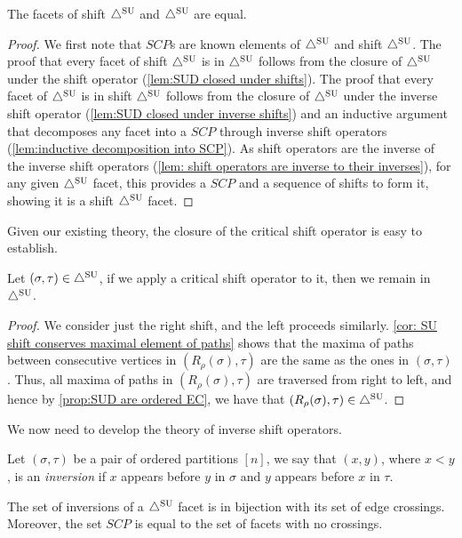\begin{proposition} 
    \label{prop: shift SUD and SUD are equal}
The facets of shift $\triangle^{\mathrm{SU}}$ and $\triangle^{\mathrm{SU}}$ are equal.
\end{proposition}
\begin{proof}
We first note that $SCP$s are known elements of $\triangle^{\mathrm{SU}}$ and shift $\triangle^{\mathrm{SU}}$.
The proof that every facet of shift $\triangle^{\mathrm{SU}}$ is in $\triangle^{\mathrm{SU}}$ follows from the closure of $\triangle^{\mathrm{SU}}$ under the shift operator (\cref{lem:SUD closed under shifts}).
The proof that every facet of $\triangle^{\mathrm{SU}}$ is in shift $\triangle^{\mathrm{SU}}$ follows from the closure of $\triangle^{\mathrm{SU}}$ under the inverse shift operator (\cref{lem:SUD closed under inverse shifts}) and an inductive argument that decomposes any facet into a $SCP$ through inverse shift operators (\cref{lem:inductive decomposition into SCP}).
As shift operators are the inverse of the inverse shift operators (\cref{lem: shift operators are inverse to their inverses}), for any given $\triangle^{\mathrm{SU}}$ facet, this provides a $SCP$ and a sequence of shifts to form it, showing it is a shift $\triangle^{\mathrm{SU}}$ facet.
\end{proof}
Given our existing theory, the closure of the critical shift operator is easy to establish.
\begin{lemma} \label{lem:SUD closed under shifts}
Let $(\sigma,\tau)\in \triangle^{\mathrm{SU}}$, if we apply a critical shift operator to it, then we remain in $\triangle^{\mathrm{SU}}$.
\end{lemma}
\begin{proof}
We consider just the right shift, and the left proceeds similarly. 
\cref{cor: SU shift conserves maximal element of paths} shows that the maxima of paths between consecutive vertices in $(R_{\rho}(\sigma),\tau)$ are the same as the ones in $(\sigma,\tau)$. 
Thus, all maxima of paths in $(R_{\rho}(\sigma),\tau)$ are traversed from right to left, and hence by \cref{prop:SUD are ordered EC}, we have that $(R_{\rho}(\sigma),\tau) \in \triangle^{\mathrm{SU}}$.   
\end{proof}

We now need to develop the theory of inverse shift operators.

\begin{definition}
Let $(\sigma,\tau)$ be a pair of ordered partitions $[n]$, we say that $(x,y)$, where $x<y$, is an \emph{inversion} if $x$ appears before $y$ in $\sigma$ and $y$ appears before $x$ in $\tau$. 
\end{definition}

\begin{proposition}
\label{p:crossings}
The set of inversions of a $\triangle^{\mathrm{SU}}$ facet is in bijection with its set of edge crossings. 
Moreover, the set $SCP$ is equal to the set of facets with no crossings.
\end{proposition}


